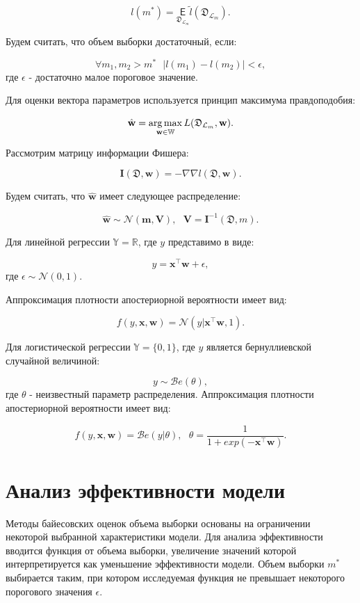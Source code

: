 \documentclass[12pt,twoside]{article}
\begin{document}
$$
l(m^*) = \underset{\mathfrak D_{\mathcal L_m}}{\mathsf E} \tilde{l}(\mathfrak D_{\mathcal L_m}).
$$

Будем считать, что объем выборки достаточный, если:

$$
\forall m_1, m_2 > m^* ~~~ |l(m_1) - l(m_2)| < \epsilon,
$$
где $\epsilon$ - достаточно малое пороговое значение.


Для оценки вектора параметров используется принцип максимума правдоподобия:

$$
\hat{\textbf{w}} = \argmax_{\textbf{w} \in \mathbb{W}} L(\mathfrak D_{\mathcal L_m}, \textbf{w}).
$$

Рассмотрим матрицу информации Фишера:

$$
\textbf{I}(\mathfrak D, \textbf{w}) = -\nabla\nabla l(\mathfrak D, \textbf{w}).
$$

Будем считать, что $\hat{\textbf{w}}$ имеет следующее распределение:

$$
\hat{\textbf{w}} \sim \mathcal{N}(\textbf{m}, \textbf{V}),~~~ \textbf{V} = \textbf{I}^{-1}(\mathfrak D, m).
$$

Для линейной регрессии $\mathbb{Y} = \mathbb{R}$, где $y$ представимо в виде:

$$
y = \textbf{x}^{\top}\textbf{w} + \epsilon,
$$
где $\epsilon \sim \mathcal{N}(0, 1)$. 

Аппроксимация плотности апостериорной вероятности имеет вид:

$$
f(y, \textbf{x}, \textbf{w}) = \mathcal{N}(y|\textbf{x}^{\top}\textbf{w}, 1).
$$ 

Для логистической регрессии $\mathbb{Y} = \{0, 1\}$, где $y$ является бернуллиевской случайной величиной:

$$
y \sim \mathcal{B}e(\theta),
$$
где $\theta$ - неизвестный параметр распределения. Аппроксимация плотности апостериорной вероятности имеет вид:

$$
f(y, \textbf{x}, \textbf{w}) = \mathcal{B}e(y|\theta),~~~ \theta = \frac{1}{1 + exp(-\textbf{x}^{\top}\textbf{w})}.
$$

\section{Анализ эффективности модели}

Методы байесовских оценок объема выборки основаны на ограничении некоторой выбранной характеристики модели. Для анализа эффективности вводится функция от объема выборки, увеличение значений которой интерпретируется как уменьшение эффективности модели. Объем выборки $m^{*}$ выбирается таким, при котором исследуемая функция не превышает некоторого порогового значения $\epsilon$.
\end{document}
